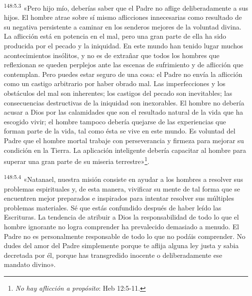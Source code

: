 \par
\textsuperscript{148:5.3} «Pero hijo mío, deberías saber que el Padre no aflige deliberadamente a sus hijos. El hombre atrae sobre sí mismo aflicciones innecesarias como resultado de su negativa persistente a caminar en los senderos mejores de la voluntad divina. La aflicción está en potencia en el mal, pero una gran parte de ella ha sido producida por el pecado y la iniquidad. En este mundo han tenido lugar muchos acontecimientos insólitos, y no es de extrañar que todos los hombres que reflexionan se queden perplejos ante las escenas de sufrimiento y de aflicción que contemplan. Pero puedes estar seguro de una cosa: el Padre no envía la aflicción como un castigo arbitrario por haber obrado mal. Las imperfecciones y los obstáculos del mal son inherentes; los castigos del pecado son inevitables; las consecuencias destructivas de la iniquidad son inexorables. El hombre no debería acusar a Dios por las calamidades que son el resultado natural de la vida que ha escogido vivir; el hombre tampoco debería quejarse de las experiencias que forman parte de la vida, tal como ésta se vive en este mundo. Es voluntad del Padre que el hombre mortal trabaje con perseverancia y firmeza para mejorar su condición en la Tierra. La aplicación inteligente debería capacitar al hombre para superar una gran parte de su miseria terrestre»\footnote{\textit{No hay aflicción a propósito}: Heb 12:5-11.}.

\par
\textsuperscript{148:5.4} «Natanael, nuestra misión consiste en ayudar a los hombres a resolver sus problemas espirituales y, de esta manera, vivificar su mente de tal forma que se encuentren mejor preparados e inspirados para intentar resolver sus múltiples problemas materiales. Sé que estás confundido después de haber leído las Escrituras. La tendencia de atribuir a Dios la responsabilidad de todo lo que el hombre ignorante no logra comprender ha prevalecido demasiado a menudo. El Padre no es personalmente responsable de todo lo que no podáis comprender. No dudes del amor del Padre simplemente porque te aflija alguna ley justa y sabia decretada por él, porque has transgredido inocente o deliberadamente ese mandato divino».

